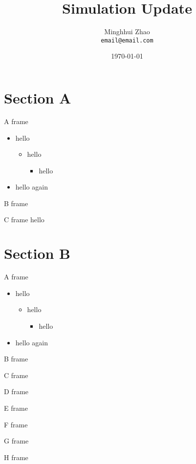 \documentclass{beamer}
\title{Simulation Update}
\institute{ISU \& BNL}
\date[]{\today}
\author[M.H Zhao]{Minghhui Zhao\\\texttt{email@email.com}}
\begin{document}
\begin{frame}
\titlepage
\end{frame}

\section{Section A}
\begin{frame}{A frame}
\begin{itemize}
\item hello
\begin{itemize}
\item hello
\begin{itemize}
\item hello
\end{itemize}
\end{itemize}
\item hello again
\end{itemize}
\end{frame}
\begin{frame}{B frame}
\end{frame}
\begin{frame}{C frame}
  hello
\end{frame}

\section{Section B}
\begin{frame}{A frame}
\begin{itemize}
\item hello
\begin{itemize}
\item hello
\begin{itemize}
\item hello
\end{itemize}
\end{itemize}
\item hello again
\end{itemize}
\end{frame}
\begin{frame}{B frame}
\end{frame}
\begin{frame}{C frame}
\end{frame}
\begin{frame}{D frame}
\end{frame}
\begin{frame}{E frame}
\end{frame}
\begin{frame}{F frame}
\end{frame}
\begin{frame}{G frame}
\end{frame}
\begin{frame}{H frame}
\end{frame}
\end{document}
